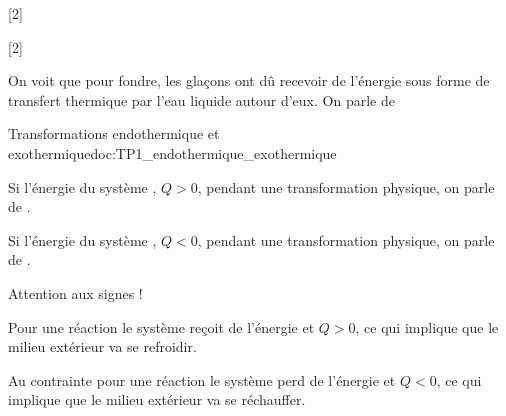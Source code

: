 [2]

[2]


\vspace*{-12pt}

On voit que pour fondre, les glaçons ont dû recevoir de l'énergie sous forme de transfert thermique par l'eau liquide autour d'eux.
On parle de 

\begin{doc}{Transformations endothermique et exothermique}{doc:TP1_endothermique_exothermique}
  \begin{importants}
    \begin{listePoints}
      \item Si l'énergie du système , $Q > 0$, pendant une transformation physique, on parle de .
      \item Si l'énergie du système , $Q < 0$, pendant une transformation physique, on parle de .
    \end{listePoints}
  \end{importants}
  \begin{center}
  \end{center}
  \attention Attention aux signes !
  
  \begin{listePoints}
    \item Pour une réaction  le système reçoit de l'énergie et $Q > 0$, ce qui implique que le milieu extérieur va se refroidir. 
    \item Au contrainte pour une réaction  le système perd de l'énergie et $Q < 0$, ce qui implique que le milieu extérieur va se réchauffer.
  \end{listePoints}
\end{doc}

